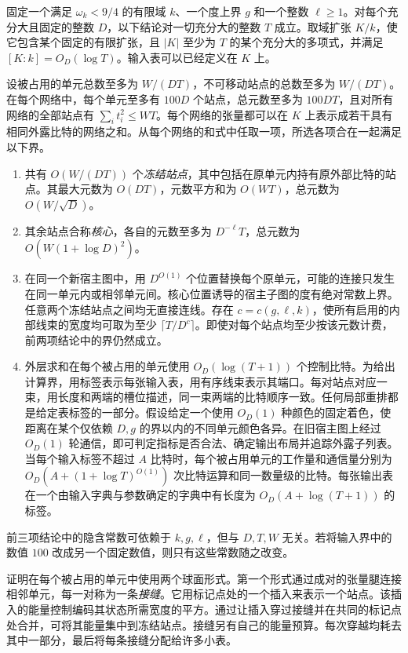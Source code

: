 \begin{lemma}[局部集中]\label{lem:local} 固定一个满足 \(\omega_k<9/4\) 的有限域 \(k\)、一个度上界 \(g\) 和一个整数 \(\ell\ge1\)。对每个充分大且固定的整数 \(D\)，以下结论对一切充分大的整数 \(T\) 成立。取域扩张 \(K/k\)，使它包含某个固定的有限扩张，且 \(|K|\) 至少为 \(T\) 的某个充分大的多项式，并满足 \([K:k]=O_D(\log T)\)。输入表可以已经定义在 \(K\) 上。

设被占用的单元总数至多为 \(W/(DT)\)，不可移动站点的总数至多为 \(W/(DT)\)。在每个网络中，每个单元至多有 \(100D\) 个站点，总元数至多为 \(100DT\)，且对所有网络的全部站点有 \(\sum_i t_i^2\le WT\)。每个网络的张量都可以在 \(K\) 上表示成若干具有相同外露比特的网络之和。从每个网络的和式中任取一项，所选各项合在一起满足以下界。\begin{enumerate}
\item 共有 \(O(W/(DT))\) 个\emph{冻结站点}，其中包括在原单元内持有原外部比特的站点。其最大元数为 \(O(DT)\)，元数平方和为 \(O(WT)\)，总元数为 \(O(W/\sqrt D)\)。\item 其余站点合称\emph{核心}，各自的元数至多为 \(D^{-\ell}T\)，总元数为 \(O(W(1+\log D)^2)\)。\item 在同一个新宿主图中，用 \(D^{O(1)}\) 个位置替换每个原单元，可能的连接只发生在同一单元内或相邻单元间。核心位置诱导的宿主子图的度有绝对常数上界。任意两个冻结站点之间均无直接连线。存在 \(c=c(g,\ell,k)\)，使所有启用的内部线束的宽度均可取为至少 \(\lceil T/D^c\rceil\)。即使对每个站点均至少按该元数计费，前两项结论中的界仍然成立。\item 外层求和在每个被占用的单元使用 \(O_D(\log(T+1))\) 个控制比特。为给出计算界，用标签表示每张输入表，用有序线束表示其端口。每对站点对应一束，用长度和两端的槽位描述，同一束两端的比特顺序一致。任何局部重排都是给定表标签的一部分。假设给定一个使用 \(O_D(1)\) 种颜色的固定着色，使距离在某个仅依赖 \(D,g\) 的界以内的不同单元颜色各异。在旧宿主图上经过 \(O_D(1)\) 轮通信，即可判定指标是否合法、确定输出布局并追踪外露子列表。当每个输入标签不超过 \(A\) 比特时，每个被占用单元的工作量和通信量分别为 \(O_D(A+(1+\log T)^{O(1)})\) 次比特运算和同一数量级的比特。每张输出表在一个由输入字典与参数确定的字典中有长度为 \(O_D(A+\log(T+1))\) 的标签。\end{enumerate}
前三项结论中的隐含常数可依赖于 \(k,g,\ell\)，但与 \(D,T,W\) 无关。若将输入界中的数值 \(100\) 改成另一个固定数值，则只有这些常数随之改变。\end{lemma}

证明在每个被占用的单元中使用两个球面形式。第一个形式通过成对的张量腿连接相邻单元，每一对称为一条\emph{接缝}。它用标记点处的一个插入来表示一个站点。该插入的能量控制编码其状态所需宽度的平方。通过让插入穿过接缝并在共同的标记点处合并，可将其能量集中到冻结站点。接缝另有自己的能量预算。每次穿越均耗去其中一部分，最后将每条接缝分配给许多小表。

